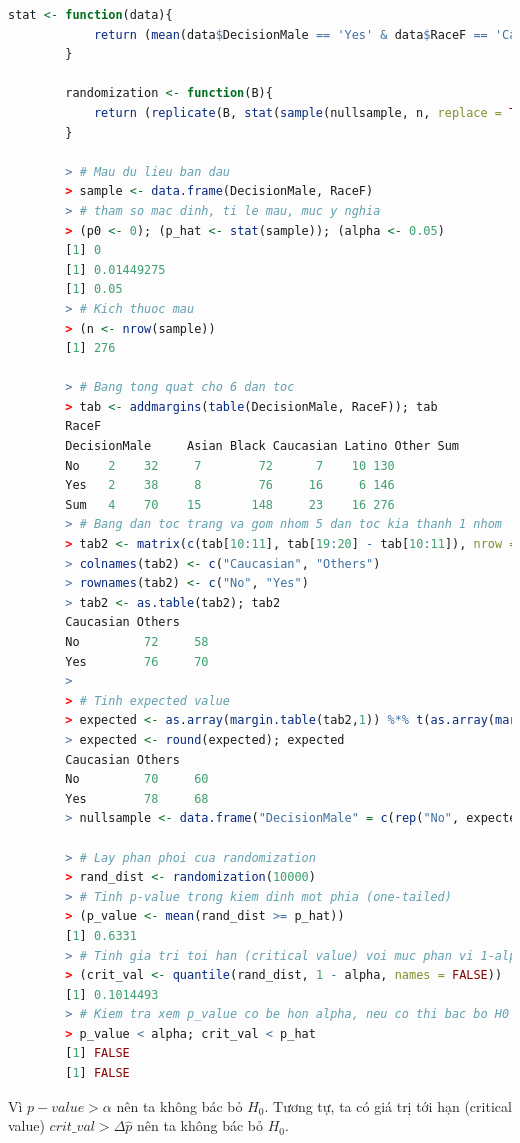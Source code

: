 \documentclass[a4paper,12pt]{article}
\begin{document}
		\begin{lstlisting}[language=R]
		stat <- function(data){
			return (mean(data$DecisionMale == 'Yes' & data$RaceF == 'Caucasian') - mean(data$DecisionMale == 'No' & data$RaceF == 'Caucasian')) # Ti le khac biet
		}
		
		randomization <- function(B){
			return (replicate(B, stat(sample(nullsample, n, replace = TRUE))))
		}
		
		> # Mau du lieu ban dau
		> sample <- data.frame(DecisionMale, RaceF)
		> # tham so mac dinh, ti le mau, muc y nghia
		> (p0 <- 0); (p_hat <- stat(sample)); (alpha <- 0.05)
		[1] 0
		[1] 0.01449275
		[1] 0.05
		> # Kich thuoc mau
		> (n <- nrow(sample))
		[1] 276
		 
		> # Bang tong quat cho 6 dan toc
		> tab <- addmargins(table(DecisionMale, RaceF)); tab
		RaceF
		DecisionMale     Asian Black Caucasian Latino Other Sum
		No    2    32     7        72      7    10 130
		Yes   2    38     8        76     16     6 146
		Sum   4    70    15       148     23    16 276
		> # Bang dan toc trang va gom nhom 5 dan toc kia thanh 1 nhom
		> tab2 <- matrix(c(tab[10:11], tab[19:20] - tab[10:11]), nrow = 2, byrow = FALSE)
		> colnames(tab2) <- c("Caucasian", "Others")
		> rownames(tab2) <- c("No", "Yes")
		> tab2 <- as.table(tab2); tab2
		Caucasian Others
		No         72     58
		Yes        76     70
		> 
		> # Tinh expected value
		> expected <- as.array(margin.table(tab2,1)) %*% t(as.array(margin.table(tab2,2))) / margin.table(tab2)
		> expected <- round(expected); expected
		Caucasian Others
		No         70     60
		Yes        78     68
		> nullsample <- data.frame("DecisionMale" = c(rep("No", expected[1]), rep("Yes", expected[2]), rep("No", expected[3]), rep("Yes", expected[4])), "RaceF" = c(rep("Caucasian", margin.table(tab2, 2)[1]), rep("Others", margin.table(tab2, 2)[2]))) # Mau du lieu tuong ung voi H0
		 
		> # Lay phan phoi cua randomization
		> rand_dist <- randomization(10000)
		> # Tinh p-value trong kiem dinh mot phia (one-tailed)
		> (p_value <- mean(rand_dist >= p_hat))
		[1] 0.6331
		> # Tinh gia tri toi han (critical value) voi muc phan vi 1-alpha
		> (crit_val <- quantile(rand_dist, 1 - alpha, names = FALSE))
		[1] 0.1014493
		> # Kiem tra xem p_value co be hon alpha, neu co thi bac bo H0
		> p_value < alpha; crit_val < p_hat
		[1] FALSE
		[1] FALSE
		\end{lstlisting}
	
		Vì $p-value > \alpha$ nên ta không bác bỏ $H_0$. Tương tự, ta có giá trị tới hạn (critical value) $crit\_val > \Delta\hat{p}$ nên ta không bác bỏ $H_0$. 
	
\end{document}
